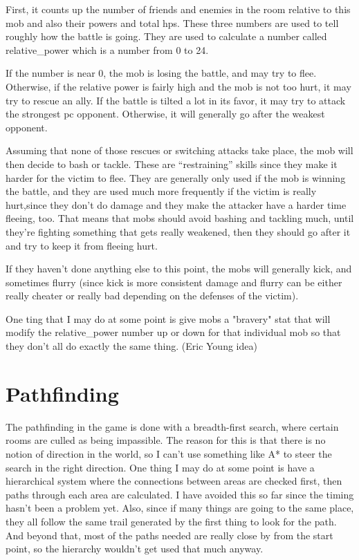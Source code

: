 First, it counts up the number of friends and enemies in the room
relative to this mob and also their powers and total hps. These three
numbers are used to tell roughly how the battle is going. They are
used to calculate a number called relative\_power which is a number
from 0 to 24. 

If the number is near 0, the mob is losing the battle,
and may try to flee. Otherwise, if the relative power is fairly high
and the mob is not too hurt, it may try to rescue an ally. If the
battle is tilted a lot in its favor, it may try to attack the
strongest pc opponent. Otherwise, it will generally go after the
weakest opponent.


Assuming that none of those rescues or switching attacks take place,
the mob will then decide to bash or tackle.  These are ``restraining''
skills since they make it harder for the victim to flee. They are
generally only used if the mob is winning the battle, and they are
used much more frequently if the victim is really hurt,since they
don't do damage and they make the attacker have a harder time fleeing,
too. That means that mobs should avoid bashing and tackling much,
until they're fighting something that gets really weakened, then they
should go after it and try to keep it from fleeing hurt.

If they haven't done anything else to this point, the mobs will
generally kick, and sometimes flurry (since kick is more consistent
damage and flurry can be either really cheater or really bad depending
on the defenses of the victim).

One ting that I may do at some point is give mobs a "bravery" stat that
will modify the relative\_power number up or down for that individual
mob so that they don't all do exactly the same thing. (Eric Young idea)



\section{Pathfinding}

The pathfinding in the game is done with a breadth-first search, where
certain rooms are culled as being impassible. The reason for this is
that there is no notion of direction in the world, so I can't use
something like A* to steer the search in the right direction. One
thing I may do at some point is have a hierarchical system where the
connections between areas are checked first, then paths through each
area are calculated. I have avoided this so far since the timing
hasn't been a problem yet. Also, since if many things are going to the
same place, they all follow the same trail generated by the first
thing to look for the path. And beyond that, most of the paths needed
are really close by from the start point, so the hierarchy wouldn't
get used that much anyway.


